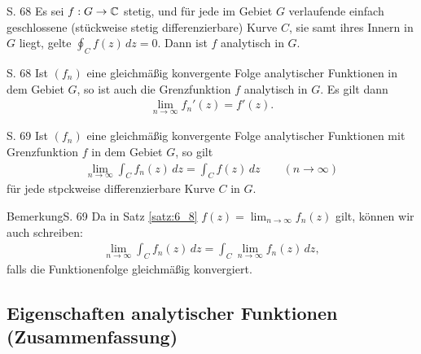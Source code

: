 \begin{lemma}{S. 68}
  Es sei $f: G \to \mathbb{C}$ stetig, und für jede im Gebiet $G$ verlaufende einfach geschlossene (stückweise stetig differenzierbare) Kurve $C$, sie samt ihres Innern in $G$ liegt, gelte $\oint_C f(z) \, dz = 0$.
  Dann ist $f$ analytisch in $G$.
\end{lemma}

\begin{satz}[Weierstraß]{S. 68}
  \label{satz:6_7}
  Ist $(f_n)$ eine gleichmäßig konvergente Folge analytischer Funktionen in dem Gebiet $G$, so ist auch die Grenzfunktion $f$ analytisch in $G$.
  Es gilt dann
  \begin{align}
    \lim_{n \to \infty} f_n'(z) = f'(z) .
  \end{align}
\end{satz}

\begin{satz}{S. 69}
  \label{satz:6_8}
  Ist $(f_n)$ eine gleichmäßig konvergente Folge analytischer Funktionen mit Grenzfunktion $f$ in dem Gebiet $G$, so gilt
  \begin{align}
    \lim_{n \to \infty} \int_C f_n(z) \, dz = \int_C f(z) \, dz \qquad (n \to \infty)
  \end{align}
  für jede stpckweise differenzierbare Kurve $C$ in $G$.
\end{satz}

\begin{bemerkung}{Bemerkung}{S. 69}
  Da in Satz \ref{satz:6_8} $f(z) = \lim_{n \to \infty} f_n(z)$ gilt, können wir auch schreiben:
  \begin{align}
    \lim_{n \to \infty} \int_C f_n(z) \, dz = \int_C \lim_{n \to \infty} f_n(z) \, dz ,
  \end{align}
  falls die Funktionenfolge gleichmäßig konvergiert.
\end{bemerkung}



\subsection{Eigenschaften analytischer Funktionen (Zusammenfassung)}

